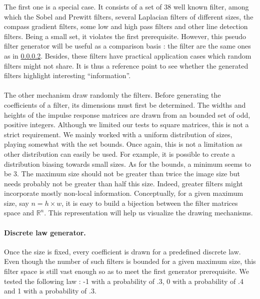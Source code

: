 \documentclass[a4paper]{report}
\begin{document}
			The first one is a special case. It consists of a set of 38 well known filter, among which the Sobel and Prewitt filters, several Laplacian filters of different sizes, the compass gradient filters, some low and high pass filters and other line detection filters.
			Being a small set, it violates the first prerequisite. However, this pseudo filter generator will be useful as a comparison basis : the filter are the same ones as in \ref{}. Besides, these filters have practical application cases which random filters might not share. It is thus a reference point to see whether the generated filters highlight interesting ``information''.
			\paragraph{}
			The other mechanism draw randomly the filters. Before generating the coefficients of a filter, its dimensions must first be determined. The widths and heights of the impulse response matrices are drawn from an bounded set of odd, positive integers. Although we limited our tests to square matrices, this is not a strict requirement.
			We mainly worked with a uniform distribution of sizes, playing somewhat with the set bounds. Once again, this is not a limitation as other distribution can easily be used. For example, it is possible to create a distribution biasing towards small sizes. 
			As for the bounds, a minimum seems to be 3. The maximum size should not be greater than twice the image size but needs probably not be greater than half this size. Indeed, greater filters might incorporate mostly non-local information.
			Conceptually, for a given maximum size, say $n = h \times w$, it is easy to build a bijection between the filter matrices space and $\mathbb{R}^n$. This representation will help us visualize the drawing mechanisms.
			\paragraph{Discrete law generator.}
			Once the size is fixed, every coefficient is drawn for a predefined discrete law. Even though the number of such filters is bounded for a given maximum size, this filter space is still vast enough so as to meet the first generator prerequisite. We tested the following law : -1 with a probability of .3, 0 with a probability of .4 and 1 with a probability of .3.
\end{document}
